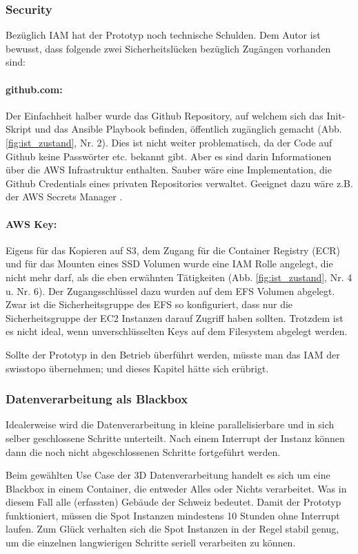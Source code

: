 \subsubsection{Security}
Bezüglich IAM hat der Prototyp noch technische Schulden. Dem Autor ist bewusst, dass folgende zwei Sicherheitslücken bezüglich Zugängen vorhanden sind:
\paragraph{github.com:} Der Einfachheit halber wurde das Github Repository, auf welchem sich das Init-Skript und das Ansible Playbook befinden, öffentlich zugänglich gemacht (Abb. \ref{fig:ist_zustand}, Nr. 2). Dies ist nicht weiter problematisch, da der Code auf Github keine Passwörter etc. bekannt gibt. Aber es sind darin Informationen über die AWS Infrastruktur enthalten. Sauber wäre eine Implementation, die Github Credentials eines privaten Repositories verwaltet. Geeignet dazu wäre z.B. der AWS Secrets Manager \cite{Secrets2020}.
\paragraph{AWS Key:} Eigens für das Kopieren auf S3, dem Zugang für die Container Registry (ECR) und für das Mounten eines SSD Volumen wurde eine IAM Rolle angelegt, die nicht mehr darf, als die eben erwähnten Tätigkeiten (Abb. \ref{fig:ist_zustand}, Nr. 4 u. Nr. 6). Der Zugangsschlüssel dazu wurden auf dem EFS Volumen abgelegt. Zwar ist die Sicherheitsgruppe des EFS so konfiguriert, dass nur die Sicherheitsgruppe der EC2 Instanzen darauf Zugriff haben sollten. Trotzdem ist es nicht ideal, wenn unverschlüsselten Keys auf dem Filesystem abgelegt werden.

Sollte der Prototyp in den Betrieb überführt werden, müsste man das IAM der swisstopo übernehmen; und dieses Kapitel hätte sich erübrigt.

\subsubsection{Datenverarbeitung als Blackbox}
Idealerweise wird die Datenverarbeitung in kleine parallelisierbare und in sich selber geschlossene Schritte unterteilt. Nach einem Interrupt der Instanz können dann die noch nicht abgeschlossenen Schritte fortgeführt werden. 

Beim gewählten Use Case der 3D Datenverarbeitung handelt es sich um eine Blackbox in einem Container, die entweder Alles oder Nichts verarbeitet. Was in diesem Fall alle (erfassten) Gebäude der Schweiz bedeutet. Damit der Prototyp funktioniert, müssen die Spot Instanzen mindestens 10 Stunden ohne Interrupt laufen. Zum Glück verhalten sich die Spot Instanzen in der Regel stabil genug, um die einzelnen langwierigen Schritte seriell verarbeiten zu können.


